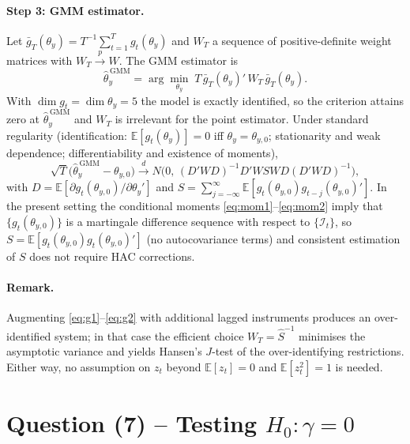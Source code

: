 \documentclass[12pt]{article}
\newcommand{\E}{\mathbb{E}}
\newcommand{\Info}{\mathcal{I}}
\begin{document}
\paragraph{Step 3: GMM estimator.} Let $\bar{g}_T(\theta_y)=T^{-1}\sum_{t=1}^{T}g_t(\theta_y)$ and $W_T$ a sequence of positive-definite weight matrices with $W_T\xrightarrow{p}W$. The GMM estimator is
\begin{equation}
\widehat{\theta}_y^{\,\text{GMM}}=\arg\min_{\theta_y}\;T\,\bar{g}_T(\theta_y)'\,W_T\,\bar{g}_T(\theta_y).\label{eq:gmm-obj}
\end{equation}
With $\dim g_t=\dim\theta_y=5$ the model is exactly identified, so the criterion attains zero at $\widehat{\theta}_y^{\,\text{GMM}}$ and $W_T$ is irrelevant for the point estimator. Under standard regularity (identification: $\E[g_t(\theta_y)]=0$ iff $\theta_y=\theta_{y,0}$; stationarity and weak dependence; differentiability and existence of moments),
\begin{equation*}
\sqrt{T}\big(\widehat{\theta}_y^{\,\text{GMM}}-\theta_{y,0}\big)\xrightarrow{d} N\!\big(0,\,(D'WD)^{-1}D'WSWD(D'WD)^{-1}\big),
\end{equation*}
with $D=\E[\partial g_t(\theta_{y,0})/\partial\theta_y']$ and $S=\sum_{j=-\infty}^{\infty}\E[g_t(\theta_{y,0})g_{t-j}(\theta_{y,0})']$. In the present setting the conditional moments \eqref{eq:mom1}--\eqref{eq:mom2} imply that $\{g_t(\theta_{y,0})\}$ is a martingale difference sequence with respect to $\{\Info_t\}$, so $S=\E[g_t(\theta_{y,0})g_t(\theta_{y,0})']$ (no autocovariance terms) and consistent estimation of $S$ does not require HAC corrections.

\paragraph{Remark.} Augmenting \eqref{eq:g1}--\eqref{eq:g2} with additional lagged instruments produces an over-identified system; in that case the efficient choice $W_T=\widehat{S}^{-1}$ minimises the asymptotic variance and yields Hansen's $J$-test of the over-identifying restrictions. Either way, no assumption on $z_t$ beyond $\E[z_t]=0$ and $\E[z_t^2]=1$ is needed.

\section*{Question (7) -- Testing $H_0:\gamma=0$}
\end{document}
